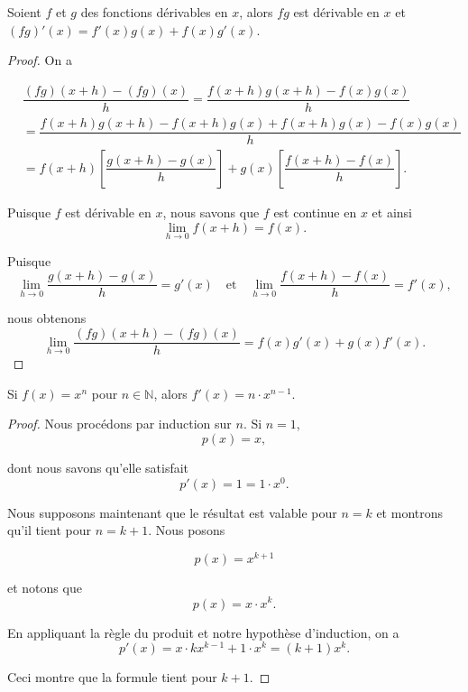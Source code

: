 \documentclass[a4paper,12pt]{article}
\begin{document}
\begin{prop}
   \tcblower
   Soient $f$ et $g$ des fonctions dérivables en $x$, alors $fg$ est dérivable en $x$ et $(fg)'(x)=f'(x)g(x)+f(x)g'(x)$. 

   \medskip

   \begin{proof}
   On a 
	   \medskip

 $\begin{aligned}
&\dfrac{(fg)(x+h) - (fg)(x)}{h} = \dfrac{f(x+h)g(x+h) - f(x)g(x)}{h}\\
&=\dfrac{f(x+h)g(x+h)-f(x+h)g(x) + f(x+h)g(x)- f(x)g(x)}{h}\\
&=f(x+h)\left[\dfrac{g(x+h) - g(x)}{h}\right] + g(x)\left[\dfrac{f(x+h) - f(x)}{h}\right].
   	\end{aligned}$
   	
	\medskip

Puisque $f$ est dérivable en $x$, nous savons que $f$ est continue en $x$ et ainsi
   	$$\lim_{h \to 0} f(x+h) = f(x).$$
   	
   	Puisque 
   	$$\lim_{h \to 0} \frac{g(x+h) - g(x)}{h} = g'(x) \quad \text{et} \quad \lim_{h \to 0} \frac{f(x+h) - f(x)}{h} = f'(x),$$
   	
   	nous obtenons
   	$$\lim_{h \to 0} \frac{(fg)(x+h) - (fg)(x)}{h} = f(x)g'(x) + g(x)f'(x).$$
   \end{proof}
\end{prop}

\begin{coro}[label=cor:puissN]
   \tcblower
   Si $f(x)=x^n$ pour $n\in \mathbb{N}$, alors $f'(x)=n\cdot x^{n-1}$.

   \begin{proof}
   	Nous procédons par induction sur $n$. Si $n = 1$,   	$$p(x) = x,$$
   	
   	dont nous savons qu'elle satisfait
   	$$p'(x) = 1 = 1 \cdot x^0.$$
   	
   	
   	Nous supposons maintenant que le résultat est valable pour $n = k$ et montrons qu'il tient pour $n = k + 1$. Nous posons

   	$$p(x) = x^{k+1}$$
   	
   	et notons que
   	$$p(x) = x \cdot x^k.$$
   	
   	En appliquant la règle du produit et notre hypothèse d'induction, on a 
   	$$p'(x) = x \cdot kx^{k-1} + 1 \cdot x^k = (k+1)x^k.$$
   	
   	Ceci montre que la formule tient pour $k + 1$.
   \end{proof}
\end{coro}
\end{document}
